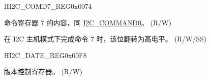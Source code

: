 \begin{register}{H}{I2C\_COMD7\_REG}{0x{}0074}\label{regdesc:I2CCOMD7REG}
%
%
%
\regnewline%
\begin{regdesc}\begin{reglist}
\label{fielddesc:I2CCOMMAND7}\item [I2C\_COMMAND7] 命令寄存器 7 的内容，同 \hyperref[fielddesc:I2CCOMMAND0]{I2C\_COMMAND0}。 (R/W)
\label{fielddesc:I2CCOMMAND7DONE}\item [I2C\_COMMAND7\_DONE] 在 I2C 主机模式下完成命令 7 时，该位翻转为高电平。 (R/W/SS)
\end{reglist}\end{regdesc}
\end{register}


\begin{register}{H}{I2C\_DATE\_REG}{0x{}00F8}\label{regdesc:I2CDATEREG}
%
\regnewline%
\begin{regdesc}\begin{reglist}
\label{fielddesc:I2CDATE}\item [I2C\_DATE] 版本控制寄存器。 (R/W)
\end{reglist}\end{regdesc}
\end{register}
